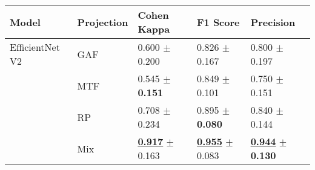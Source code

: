 
\begin{tabular}{lllll}
\toprule
Model & Projection & Cohen Kappa & F1 Score & Precision \\
\midrule
EfficientNet V2 & GAF & \textcolor[rgb]{0.8530612245,0.1469387755,0}{0.600} $\pm$ \textcolor[rgb]{0.5890220097,0.4109779903,0}{0.200} & \textcolor[rgb]{1.0000000000,0.0000000000,0}{0.826} $\pm$ \textcolor[rgb]{1.0000000000,0.0000000000,0}{0.167} & \textcolor[rgb]{0.7428571429,0.2571428571,0}{0.800} $\pm$ \textcolor[rgb]{1.0000000000,0.0000000000,0}{0.197} \\
 & MTF & \textcolor[rgb]{1.0000000000,0.0000000000,0}{0.545} $\pm$ \textbf{\textcolor[rgb]{0.0000000000,0.5000000000,0}{0.151}} & \textcolor[rgb]{0.8209876543,0.1790123457,0}{0.849} $\pm$ \textcolor[rgb]{0.2410868124,0.5000000000,0}{0.101} & \textcolor[rgb]{1.0000000000,0.0000000000,0}{0.750} $\pm$ \textcolor[rgb]{0.3114153487,0.5000000000,0}{0.151} \\
 & RP & \textcolor[rgb]{0.5612244898,0.4387755102,0}{0.708} $\pm$ \textcolor[rgb]{1.0000000000,0.0000000000,0}{0.234} & \textcolor[rgb]{0.4629629630,0.5000000000,0}{0.895} $\pm$ \textbf{\textcolor[rgb]{0.0000000000,0.5000000000,0}{0.080}} & \textcolor[rgb]{0.5357142857,0.4642857143,0}{0.840} $\pm$ \textcolor[rgb]{0.2135623148,0.5000000000,0}{0.144} \\
 & Mix & \underline{\textbf{\textcolor[rgb]{0.0000000000,0.5000000000,0}{0.917}}} $\pm$ \textcolor[rgb]{0.1444802924,0.5000000000,0}{0.163} & \underline{\textbf{\textcolor[rgb]{0.0000000000,0.5000000000,0}{0.955}}} $\pm$ \textcolor[rgb]{0.0326396716,0.5000000000,0}{0.083} & \underline{\textbf{\textcolor[rgb]{0.0000000000,0.5000000000,0}{0.944}}} $\pm$ \textbf{\textcolor[rgb]{0.0000000000,0.5000000000,0}{0.130}} \\
\bottomrule
\end{tabular}

